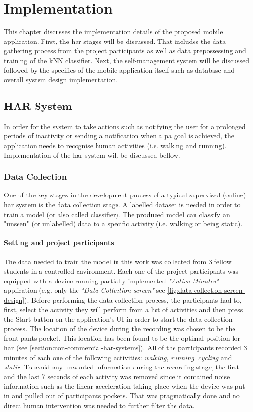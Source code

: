 \chapter{Implementation}
This chapter discusses the implementation details of the proposed mobile application. First, the \gls{har} stages will be discussed. That includes the data gathering process from the project participants as well as data prepossessing and training of the kNN classifier. Next, the self-management system will be discussed followed by the specifics of the mobile application itself such as database and overall system design implementation.

\section{HAR System}
In order for the system to take actions such as notifying the user for a prolonged periods of inactivity or sending a notification when a \gls{pa} goal is achieved, the application needs to recognise human activities (i.e. walking and running). Implementation of the \gls{har} system will be discussed bellow.

    \subsection{Data Collection}
    One of the key stages in the development process of a typical supervised (online) \gls{har} system is the data collection stage. A labelled dataset is needed in order to train a model (or also called classifier). The produced model can classify an "unseen" (or unlabelled) data to a specific activity (i.e. walking or being static).
    
    \subsubsection{Setting and project participants}
    The data needed to train the model in this work was collected from 3 fellow students in a controlled environment. Each one of the project participants was equipped with a device running partially implemented \textit{"Active Minutes"} application (e.g. only the \textit{"Data Collection screen"} see \ref{fig:data-collection-screen-design}). Before performing the data collection process, the participants had to, first, select the activity they will perform from a list of activities and then press the Start button on the application's UI in order to start the data collection process. The location of the device during the recording was chosen to be the front pants pocket. This location has been found to be the optimal position for \gls{har} (see \ref{section:non-commercial-har-systems}). All of the participants recorded 3 minutes of each one of the following activities: \textit{walking}, \textit{running}, \textit{cycling} and \textit{static}. To avoid any unwanted information during the recording stage, the first and the last 7 seconds of each activity was removed since it contained noise information such as the linear acceleration taking place when the device was put in and pulled out of participants pockets. That was pragmatically done and no direct human intervention was needed to further filter the data.
    
